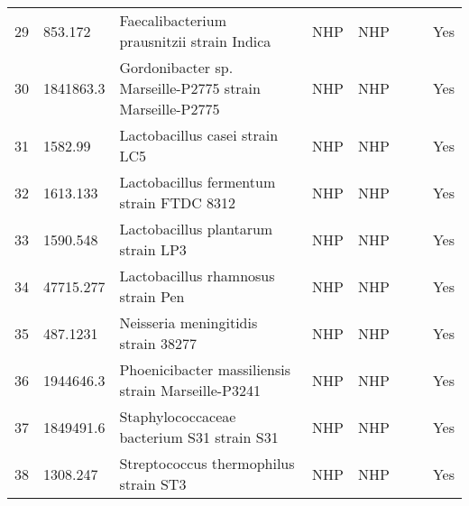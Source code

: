 \begin{tabular}{llllllll}
29  &     853.172 &                        Faecalibacterium prausnitzii strain Indica &           NHP &             NHP &                        \cite{bag2017completeFaecalibacterium} &                                  &           Yes \\
30  &   1841863.3 &          Gordonibacter sp. Marseille-P2775 strain Marseille-P2775 &           NHP &             NHP &                                         \cite{ngom2020taxono} &                                  &           Yes \\
31  &     1582.99 &                                    Lactobacillus casei strain LC5 &           NHP &             NHP &                                       \cite{kang2017complete} &                                  &           Yes \\
32  &    1613.133 &                          Lactobacillus fermentum strain FTDC 8312 &           NHP &             NHP &                                   \cite{lye2017lactobacillus} &                                  &           Yes \\
33  &    1590.548 &                                Lactobacillus plantarum strain LP3 &           NHP &             NHP &                                      \cite{ding2020influence} &                                  &           Yes \\
34  &   47715.277 &                                Lactobacillus rhamnosus strain Pen &           NHP &             NHP &                                    \cite{jarocki2018complete} &                                  &           Yes \\
35  &    487.1231 &                               Neisseria meningitidis strain 38277 &           NHP &             NHP &                                 \cite{bernardini2004proteome} &    \cite{bernardini2004proteome} &           Yes \\
36  &   1944646.3 &                Phoenicibacter massiliensis strain Marseille-P3241 &           NHP &             NHP &                                \cite{bilen2017phoenicibacter} &                                  &           Yes \\
37  &   1849491.6 &                        Staphylococcaceae bacterium S31 strain S31 &           NHP &             NHP &                                 \cite{prakash2017description} &                                  &           Yes \\
38  &    1308.247 &                             Streptococcus thermophilus strain ST3 &           NHP &             NHP &                             \cite{alexandraki2019comparative} &                                  &           Yes \\

\end{tabular}
